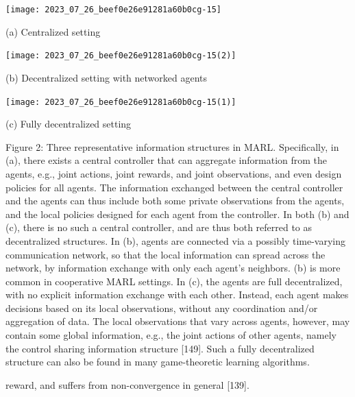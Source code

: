 \documentclass[10pt]{article}
\begin{document}
\begin{center}
\texttt{[image: 2023\_07\_26\_beef0e26e91281a60b0cg-15]}
\end{center}

(a) Centralized setting

\begin{center}
\texttt{[image: 2023\_07\_26\_beef0e26e91281a60b0cg-15(2)]}
\end{center}

(b) Decentralized setting with networked agents

\begin{center}
\texttt{[image: 2023\_07\_26\_beef0e26e91281a60b0cg-15(1)]}
\end{center}

(c) Fully decentralized setting

Figure 2: Three representative information structures in MARL. Specifically, in (a), there exists a central controller that can aggregate information from the agents, e.g., joint actions, joint rewards, and joint observations, and even design policies for all agents. The information exchanged between the central controller and the agents can thus include both some private observations from the agents, and the local policies designed for each agent from the controller. In both (b) and (c), there is no such a central controller, and are thus both referred to as decentralized structures. In (b), agents are connected via a possibly time-varying communication network, so that the local information can spread across the network, by information exchange with only each agent's neighbors. (b) is more common in cooperative MARL settings. In (c), the agents are full decentralized, with no explicit information exchange with each other. Instead, each agent makes decisions based on its local observations, without any coordination and/or aggregation of data. The local observations that vary across agents, however, may contain some global information, e.g., the joint actions of other agents, namely the control sharing information structure [149]. Such a fully decentralized structure can also be found in many game-theoretic learning algorithms.

reward, and suffers from non-convergence in general [139].
\end{document}

